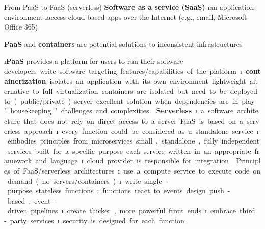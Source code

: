 \begin{frame}[allowframebreaks]{From PaaS to FaaS (serverless)}
\textbf{Software as a service (SaaS)} 
\i an application environment 
\i access cloud-based apps over the Internet (e.g., email, Microsoft Office 365)
\framebreak

\textbf{PaaS} and \textbf{containers} are potential solutions to inconsistent infrastructures

\i \textbf{PaaS} provides a platform for users to run their software
\si developers write software targeting features/capabilities of the platform

\i \textbf{containerization} isolates an application with its own environment
\si lightweight alternative to full virtualization
\si containers are isolated but need to be deployed to (public/private) server
\si excellent solution when dependencies are in play
\si "housekeeping" challenges and complexities


\framebreak


\textbf{Serverless}
\i a software architecture that does not rely on direct access to a server

FaaS is based on a serverless approach
\i every function could be considered as a standalone service
\i embodies principles from microservices
\si small, standalone, fully independent services built for a specific purpose
\si each service written in an appropriate framework and language
\i cloud provider is responsible for integration 

\framebreak

Principles of FaaS/serverless architectures
\i use a compute service to execute code on demand (no servers/containers)
\i write single-purpose stateless functions
\i functions react to events
\si design push-based, event-driven pipelines
\i create thicker, more powerful front ends
\i embrace third-party services
\i security is designed for each function


\end{frame}
